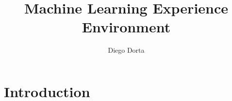 \documentclass[8pt,letterpaper]{article}
\title{\textbf{Machine Learning Experience Environment}}
\author{Diego Dorta}
\begin{document}
\maketitle

\section{Introduction}
\end{document}
